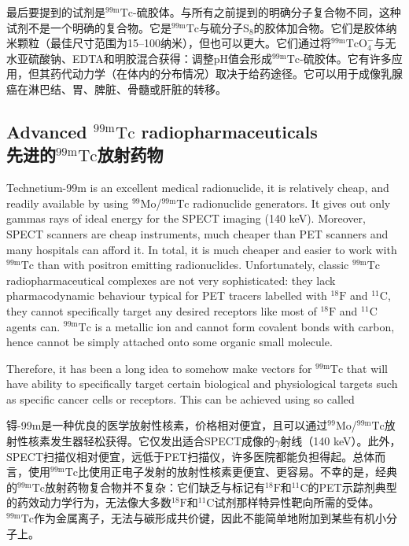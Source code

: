 \documentclass[dvipsnames, svgnames,a4paper,11pt]{article}
\begin{document}
最后要提到的试剂是${}^\mathrm{99m}\mathrm{Tc}$-硫胶体。与所有之前提到的明确分子复合物不同，这种试剂不是一个明确的复合物。它是${}^\mathrm{99m}\mathrm{Tc}$与硫分子S${}_8$的胶体加合物。它们是胶体纳米颗粒（最佳尺寸范围为15–100纳米），但也可以更大。它们通过将${}^\mathrm{99m}\mathrm{TcO_4^-}$与无水亚硫酸钠、EDTA和明胶混合获得：调整pH值会形成${}^\mathrm{99m}\mathrm{Tc}$-硫胶体。它有许多应用，但其药代动力学（在体内的分布情况）取决于给药途径。它可以用于成像乳腺癌在淋巴结、胃、脾脏、骨髓或肝脏的转移。

\subsection{Advanced ${}^\mathrm{99m}\mathrm{Tc}$ radiopharmaceuticals \\先进的${}^\mathrm{99m}\mathrm{Tc}$放射药物}

Technetium-99m is an excellent medical radionuclide, it is relatively cheap, and
readily available by using ${}^\mathrm{99}\mathrm{Mo}$/${}^\mathrm{99m}\mathrm{Tc}$ radionuclide generators. It gives out only
gammas rays of ideal energy for the SPECT imaging (140 keV). Moreover, SPECT
scanners are cheap instruments, much cheaper than PET scanners and many
hospitals can afford it. In total, it is much cheaper and easier to work with ${}^\mathrm{99m}\mathrm{Tc}$ than
with positron emitting radionuclides. Unfortunately, classic ${}^\mathrm{99m}\mathrm{Tc}$ radiopharmaceutical
complexes are not very sophisticated: they lack pharmacodynamic behaviour typical
for PET tracers labelled with ${}^\mathrm{18}\mathrm{F}$ and ${}^\mathrm{11}\mathrm{C}$, they cannot specifically target any desired
receptors like most of ${}^\mathrm{18}\mathrm{F}$ and ${}^\mathrm{11}\mathrm{C}$ agents can. ${}^\mathrm{99m}\mathrm{Tc}$ is a metallic ion and cannot form
covalent bonds with carbon, hence cannot be simply attached onto some organic
small molecule.

Therefore, it has been a long idea to somehow make vectors for ${}^\mathrm{99m}\mathrm{Tc}$ that will have
ability to specifically target certain biological and physiological targets such as
specific cancer cells or receptors. This can be achieved using so called
 
锝-99m是一种优良的医学放射性核素，价格相对便宜，且可以通过${}^\mathrm{99}\mathrm{Mo}$/${}^\mathrm{99m}\mathrm{Tc}$放射性核素发生器轻松获得。它仅发出适合SPECT成像的$\gamma$射线（140 keV）。此外，SPECT扫描仪相对便宜，远低于PET扫描仪，许多医院都能负担得起。总体而言，使用${}^\mathrm{99m}\mathrm{Tc}$比使用正电子发射的放射性核素更便宜、更容易。不幸的是，经典的${}^\mathrm{99m}\mathrm{Tc}$放射药物复合物并不复杂：它们缺乏与标记有${}^\mathrm{18}\mathrm{F}$和${}^\mathrm{11}\mathrm{C}$的PET示踪剂典型的药效动力学行为，无法像大多数${}^\mathrm{18}\mathrm{F}$和${}^\mathrm{11}\mathrm{C}$试剂那样特异性靶向所需的受体。${}^\mathrm{99m}\mathrm{Tc}$作为金属离子，无法与碳形成共价键，因此不能简单地附加到某些有机小分子上。
\end{document}
